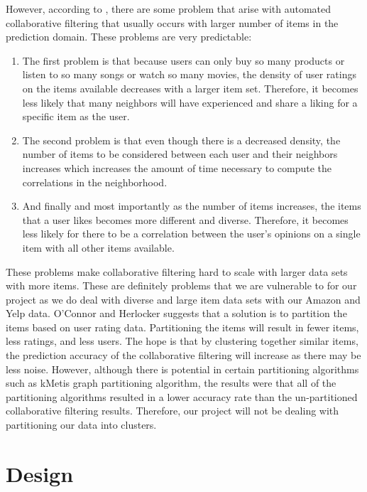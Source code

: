 \documentclass[conference]{IEEEtran}
\begin{document}
However, according to \cite{ClusteringItems}, there are some problem that arise with automated collaborative filtering that usually occurs with larger number of items in the prediction domain. These problems are very predictable:

\begin{enumerate}
  \item The first problem is that because users can only buy so many products or listen to so many songs or watch so many
        movies, the density of user ratings on the items available decreases with a larger item set.  Therefore, it becomes 
        less likely that many neighbors will have experienced and share a liking for a specific item as the user.
  \item The second problem is that even though there is a decreased density, the number of items to be considered between 
        each user and their neighbors increases which increases the amount of time necessary to compute the correlations in 
        the neighborhood.
  \item And finally and most importantly as the number of items increases, the items that a user likes becomes more different
        and diverse.  Therefore, it becomes less likely for there to be a correlation between the user’s opinions on a single
        item with all other items available.
\end{enumerate}

These problems make collaborative filtering hard to scale with larger data sets with more items.  These are definitely problems that we are vulnerable to for our project as we do deal with diverse and large item data sets with our Amazon and Yelp data.  O’Connor and Herlocker \cite{ClusteringItems} suggests that a solution is to partition the items based on user rating data.  Partitioning the items will result in fewer items, less ratings, and less users.  The hope is that by clustering together similar items, the prediction accuracy of the collaborative filtering will increase as there may be less noise.  However, although there is potential in certain partitioning algorithms such as kMetis graph partitioning algorithm, the results were that all of the partitioning algorithms resulted in a lower accuracy rate than the un-partitioned collaborative filtering results.  Therefore, our project will not be dealing with partitioning our data into clusters. 

\section{Design}
\end{document}
